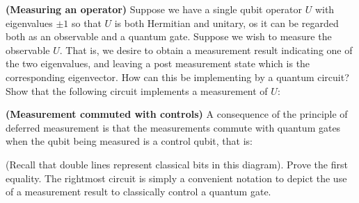 \begin{example}
    \textbf{(Measuring an operator)} Suppose we have a single qubit operator $U$ with eigenvalues $\pm1$ so that $U$ is both Hermitian and unitary, os it can be regarded both as an observable and a quantum gate. Suppose we wish to measure the observable $U$. That is, we desire to obtain a measurement result indicating one of the two eigenvalues, and leaving a post measurement state which is the corresponding eigenvector. How can this be implementing by a quantum circuit? Show that the following circuit implements a measurement of $U$:
\end{example}

\begin{example}
    \textbf{(Measurement commuted with controls)} A consequence of the principle of deferred measurement is that the measurements commute with quantum gates when the qubit being measured is a control qubit, that is:

    
(Recall that double lines represent classical bits in this diagram). Prove the first equality. The rightmost circuit is simply a convenient notation to depict the use of a measurement result to classically control a quantum gate.
\end{example}






\chapterreferences

